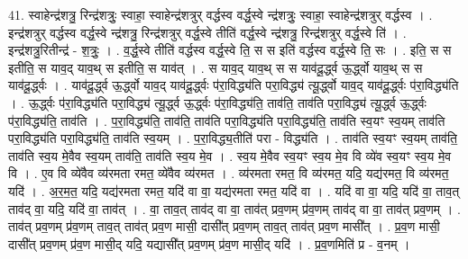 \documentclass[17pt]{extarticle}
\begin{document}
41. स्वाहेन्द्र॑शत्रु॒ रिन्द्र॑शत्रुः॒ स्वाहा॒ स्वाहेन्द्र॑शत्रुर् वर्द्धस्व वर्द्ध॒स्वे न्द्र॑शत्रुः॒ स्वाहा॒ स्वाहेन्द्र॑शत्रुर् वर्द्धस्व । . इन्द्र॑शत्रुर् वर्द्धस्व वर्द्ध॒स्वे न्द्र॑शत्रु॒ रिन्द्र॑शत्रुर् वर्द्ध॒स्वे तीति॑ वर्द्ध॒स्वे न्द्र॑शत्रु॒ रिन्द्र॑शत्रुर् वर्द्ध॒स्वे ति॑ । . इन्द्र॑शत्रु॒रितीन्द्र॑ - श॒त्रुः॒ । . व॒र्द्ध॒स्वे तीति॑ वर्द्धस्व वर्द्ध॒स्वे ति॒ स स इति॑ वर्द्धस्व वर्द्ध॒स्वे ति॒ सः । . इति॒ स स इतीति॒ स याव॒द् याव॒थ् स इतीति॒ स याव॑त् । . स याव॒द् याव॒थ् स स याव॑दू॒र्द्ध्व ऊ॒र्द्ध्वो याव॒थ् स स याव॑दू॒र्द्ध्वः । . याव॑दू॒र्द्ध्व ऊ॒र्द्ध्वो याव॒द् याव॑दू॒र्द्ध्वः प॑रा॒विद्ध्य॑ति परा॒विद्ध्य॑ त्यू॒र्द्ध्वो याव॒द् याव॑दू॒र्द्ध्वः प॑रा॒विद्ध्य॑ति । . ऊ॒र्द्ध्वः प॑रा॒विद्ध्य॑ति परा॒विद्ध्य॑ त्यू॒र्द्ध्व ऊ॒र्द्ध्वः प॑रा॒विद्ध्य॑ति॒ ताव॑ति॒ ताव॑ति परा॒विद्ध्य॑ त्यू॒र्द्ध्व ऊ॒र्द्ध्वः प॑रा॒विद्ध्य॑ति॒ ताव॑ति । . प॒रा॒विद्ध्य॑ति॒ ताव॑ति॒ ताव॑ति परा॒विद्ध्य॑ति परा॒विद्ध्य॑ति॒ ताव॑ति स्व॒यꣳ स्व॒यम् ताव॑ति परा॒विद्ध्य॑ति परा॒विद्ध्य॑ति॒ ताव॑ति स्व॒यम् । . प॒रा॒विद्ध्य॒तीति॑ परा - विद्ध्य॑ति । . ताव॑ति स्व॒यꣳ स्व॒यम् ताव॑ति॒ ताव॑ति स्व॒य मे॒वैव स्व॒यम् ताव॑ति॒ ताव॑ति स्व॒य मे॒व । . स्व॒य मे॒वैव स्व॒यꣳ स्व॒य मे॒व वि व्ये॑व स्व॒यꣳ स्व॒य मे॒व वि । . ए॒व वि व्ये॑वैव व्य॑रमता रमत॒ व्ये॑वैव व्य॑रमत । . व्य॑रमता रमत॒ वि व्य॑रमत॒ यदि॒ यद्य॑रमत॒ वि व्य॑रमत॒ यदि॑ । . अ॒र॒म॒त॒ यदि॒ यद्य॑रमता रमत॒ यदि॑ वा वा॒ यद्य॑रमता रमत॒ यदि॑ वा । . यदि॑ वा वा॒ यदि॒ यदि॑ वा॒ ताव॒त् ताव॑द् वा॒ यदि॒ यदि॑ वा॒ ताव॑त् । . वा॒ ताव॒त् ताव॑द् वा वा॒ ताव॑त् प्रव॒णम् प्र॑व॒णम् ताव॑द् वा वा॒ ताव॑त् प्रव॒णम् । . ताव॑त् प्रव॒णम् प्र॑व॒णम् ताव॒त् ताव॑त् प्रव॒ण मासी॒ दासी᳚त् प्रव॒णम् ताव॒त् ताव॑त् प्रव॒ण मासी᳚त् । . प्र॒व॒ण मासी॒ दासी᳚त् प्रव॒णम् प्र॑व॒ण मासी॒द् यदि॒ यद्यासी᳚त् प्रव॒णम् प्र॑व॒ण मासी॒द् यदि॑ । . प्र॒व॒णमिति॑ प्र - व॒नम् । \newline
\pagebreak
{}
\end{document}
